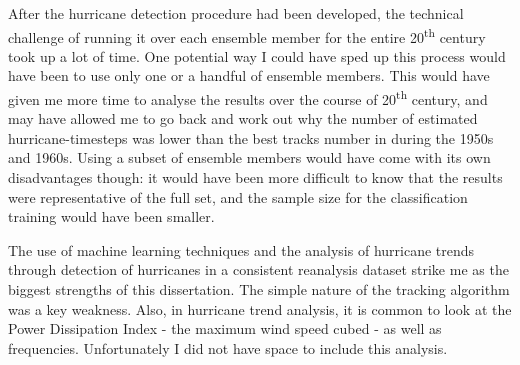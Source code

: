\documentclass[pdftex,12pt,a4paper]{report}
\newcommand{\ts}{\textsuperscript}
\begin{document}
After the hurricane detection procedure had been developed, the technical challenge of running it
over each ensemble member for the entire 20\ts{th} century took up a lot of time. One potential way
I could have sped up this process would have been to use only one or a handful of ensemble members.
This would have given me more time to analyse the results over the course of 20\ts{th} century, and
may have allowed me to go back and work out why the number of estimated hurricane-timesteps was
lower than the best tracks number in during the 1950s and 1960s. Using a subset of ensemble members
would have come with its own disadvantages though: it would have been more difficult to know that
the results were representative of the full set, and the sample size for the classification training
would have been smaller.

The use of machine learning techniques and the analysis of hurricane trends through detection of
hurricanes in a consistent reanalysis dataset strike me as the biggest strengths of this
dissertation. The simple nature of the tracking algorithm was a key weakness. Also, in hurricane
trend analysis, it is common to look at the Power Dissipation Index - the maximum wind speed cubed -
as well as frequencies. Unfortunately I did not have space to include this analysis.

\printbibliography[title={References}]

\end{document}
